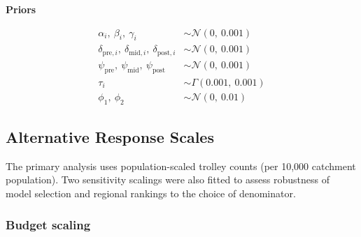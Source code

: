 \documentclass[
]{article}
\begin{document}
\textbf{Priors}

\[
\begin{aligned}
\alpha_i,\ \beta_i,\ \gamma_i &\sim \mathcal{N}(0,\ 0.001) \\[4pt]
\delta_{\text{pre},i},\ \delta_{\text{mid},i},\ \delta_{\text{post},i} &\sim \mathcal{N}(0,\ 0.001) \\[4pt]
\psi_{\text{pre}},\ \psi_{\text{mid}},\ \psi_{\text{post}} &\sim \mathcal{N}(0,\ 0.001) \\[4pt]
\tau_i &\sim \Gamma(0.001,\ 0.001) \\[4pt]
\phi_1,\ \phi_2 &\sim \mathcal{N}(0,\ 0.01)
\end{aligned}
\]

\subsection{\texorpdfstring{Alternative Response Scales \label{sect:alt-scales}}{Alternative Response Scales }}\label{alternative-response-scales}

The primary analysis uses population-scaled trolley counts (per 10,000 catchment population). Two sensitivity scalings were also fitted to assess robustness of model selection and regional rankings to the choice of denominator.

\subsubsection{Budget scaling}\label{budget-scaling-1}
\end{document}
